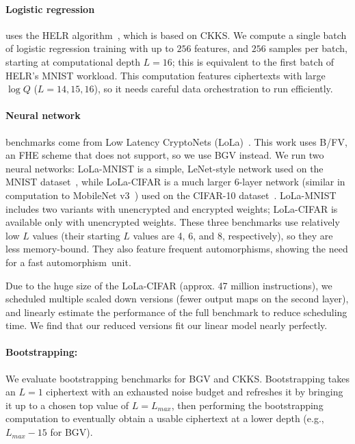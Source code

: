 \paragraph{Logistic regression} uses the HELR algorithm~\cite{han:aaai19:logistic}, which is based on CKKS.
We compute a single batch of logistic regression training with up to $256$ features, and $256$ samples per batch,
starting at computational depth $L = 16$; this is equivalent to the first batch of HELR's MNIST workload. 
This computation features %
ciphertexts with large $\log Q$ ($L = 14,15,16$), so it needs careful data orchestration to run efficiently.

\paragraph{Neural network} benchmarks come from Low Latency CryptoNets (LoLa)~\cite{brutzkus:icml19:low}.
This work uses B/FV, an FHE scheme that \name does not support, so we use BGV instead.
We run two neural networks:
LoLa-MNIST is a simple, LeNet-style network used on the MNIST dataset~\cite{lecunn:ieee98:gradient-document},
while LoLa-CIFAR is a much larger 6-layer network (similar in computation to MobileNet v3~\cite{howard2019searching})
used on the CIFAR-10 dataset~\cite{cifar10}.
LoLa-MNIST includes two variants with unencrypted and encrypted weights;
LoLa-CIFAR is available only with unencrypted weights.
These three benchmarks use relatively low $L$ values (their starting $L$ values are 4, 6, and 8, respectively),
so they are less memory-bound.
They also feature frequent automorphisms,
showing the need for a fast automorphism~unit.

Due to the huge size of the LoLa-CIFAR (approx. 47 million instructions), we scheduled multiple scaled down versions (fewer output maps on the second layer), and linearly estimate the performance of the full benchmark to reduce scheduling time. We find that our reduced versions fit our linear model nearly perfectly.



\paragraph{Bootstrapping:} We evaluate bootstrapping benchmarks for BGV and CKKS.
Bootstrapping takes an $L=1$ ciphertext with an exhausted noise budget and refreshes it
by bringing it up to a chosen top value of $L=L_{max}$, then performing the bootstrapping computation
to eventually obtain a usable ciphertext at a lower depth (e.g., $L_{max} - 15$ for BGV).

